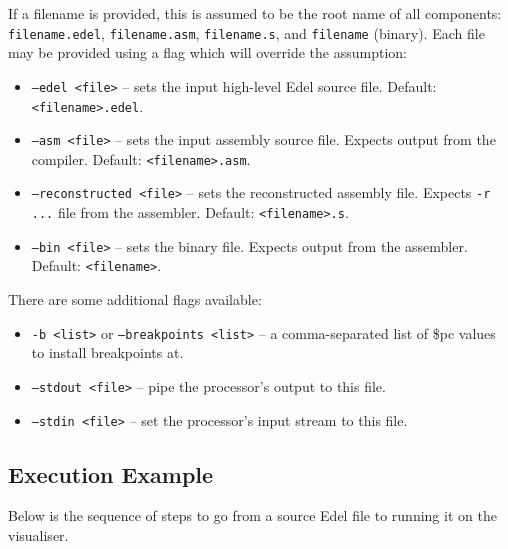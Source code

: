 \documentclass[10pt]{article}
\begin{document}
    If a filename is provided, this is assumed to be the root name of all components: \texttt{filename.edel}, \texttt{filename.asm}, \texttt{filename.s}, and \texttt{filename} (binary).
    Each file may be provided using a flag which will override the assumption:
    \begin{itemize}
        \item \texttt{--edel <file>} -- sets the input high-level Edel source file.
        Default: \texttt{<filename>.edel}.
        \item \texttt{--asm <file>} -- sets the input assembly source file.
        Expects output from the compiler.
        Default: \texttt{<filename>.asm}.
        \item \texttt{--reconstructed <file>} -- sets the reconstructed assembly file.
        Expects \texttt{-r ...} file from the assembler.
        Default: \texttt{<filename>.s}.
        \item \texttt{--bin <file>} -- sets the binary file.
        Expects output from the assembler.
        Default: \texttt{<filename>}.
    \end{itemize}

    There are some additional flags available:
    \begin{itemize}
        \item \texttt{-b <list>} or \texttt{--breakpoints <list>} -- a comma-separated list of \$pc values to install breakpoints at.
        \item \texttt{--stdout <file>} -- pipe the processor's output to this file.
        \item \texttt{--stdin <file>} -- set the processor's input stream to this file.
    \end{itemize}

    \subsection{Execution Example}

    Below is the sequence of steps to go from a source Edel file to running it on the visualiser.
\end{document}
